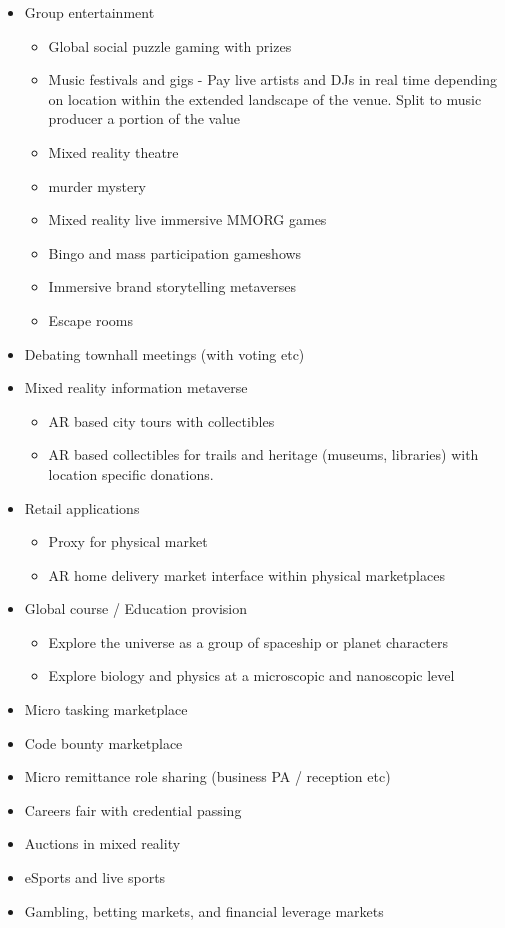 \begin{itemize}
\item
  Group entertainment

  \begin{itemize}
  \item Global social puzzle gaming with prizes
  \item
    Music festivals and gigs - Pay live artists and DJs in real time
    depending on location within the extended landscape of the venue.
    Split to music producer a portion of the value
  \item
    Mixed reality theatre
  \item
    murder mystery
  \item
    Mixed reality live immersive MMORG games
  \item
    Bingo and mass participation gameshows
  \item
    Immersive brand storytelling metaverses
  \item
    Escape rooms
  \end{itemize}
\item
  Debating townhall meetings (with voting etc)
\item
  Mixed reality information metaverse

  \begin{itemize}
  \item
    AR based city tours with collectibles
  \item
    AR based collectibles for trails and heritage (museums, libraries)
    with location specific donations.
  \end{itemize}
\item
  Retail applications

  \begin{itemize}
  \item
    Proxy for physical market
  \item
    AR home delivery market interface within physical marketplaces
  \end{itemize}
\item
  Global course / Education provision
    \begin{itemize}
  \item
    Explore the universe as a group of spaceship or planet characters
  \item
    Explore biology and physics at a microscopic and nanoscopic level
  \end{itemize}
\item
  Micro tasking marketplace
\item
  Code bounty marketplace
\item
  Micro remittance role sharing (business PA / reception etc)
\item
  Careers fair with credential passing
\item
  Auctions in mixed reality
\item
  eSports and live sports
\item
  Gambling, betting markets, and financial leverage markets
\end{itemize}

